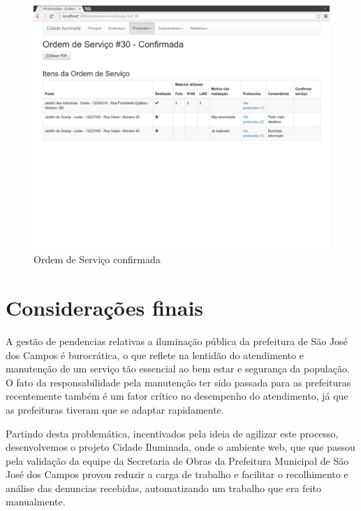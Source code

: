 \documentclass[
	article,			%
	11pt,				%
	oneside,			%
	a4paper,			%
	english,			%
	brazil,				%
	sumario=tradicional
	]{abntex2}
\begin{document}
\begin{figure}[!htbp]
 \centering
 \caption{\label{site-os-confirmada}Ordem de Serviço confirmada}
 \includegraphics[scale=0.25]{site/20-os_confirmada.png}
\end{figure}

\clearpage

%

\section*{Considerações finais}

A gestão de pendencias relativas a iluminação pública da prefeitura de São José
dos Campos é burocrática, o que reflete na lentidão do atendimento e manutenção
de um serviço tão essencial ao bem estar e segurança da população. O fato da
responsabilidade pela manutenção ter sido passada para as prefeituras recentemente
também é um fator crítico no desempenho do atendimento, já que as prefeituras
tiveram que se adaptar rapidamente.

Partindo desta problemática, incentivados pela ideia de agilizar este processo,
desenvolvemos o projeto Cidade Iluminada, onde o ambiente web, que que passou
pela validação da equipe da Secretaria de Obras da Prefeitura Municipal de São
José dos Campos provou reduzir a carga de trabalho e facilitar o recolhimento e
análise das denuncias recebidas, automatizando um trabalho que era feito manualmente.
\end{document}

